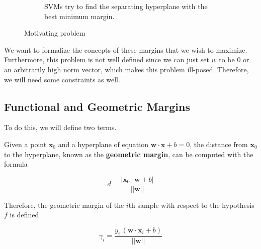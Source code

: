 \begin{example}
\begin{figure}[H]
\begin{subfigure}[b]{0.45\textwidth}
        \caption{SVMs try to find the separating hyperplane with the best minimum margin.} 
        \label{fig:svm_intro2}
      \end{subfigure} 
      \caption{Motivating problem} 
      \label{fig:svm_intro} 
    \end{figure}
  \end{example} 

  We want to formalize the concepts of these margins that we wish to maximize. Furthermore, this problem is not well defined since we can just set $w$ to be $0$ or an arbitrarily high norm vector, which makes this problem ill-posed. Therefore, we will need some constraints as well. 

\subsection{Functional and Geometric Margins} 
  
  To do this, we will define two terms. 

  \begin{definition}
    Given a point $\mathbf{x}_0$ and a hyperplane of equation $\mathbf{w} \cdot \mathbf{x} + b = 0$, the distance from $\mathbf{x}_0$ to the hyperplane, known as the \textbf{geometric margin}, can be computed with the formula 

    \begin{equation}
      d = \frac{|\mathbf{x}_0 \cdot \mathbf{w} + b|}{||\mathbf{w}||}  
    \end{equation} 

    Therefore, the geometric margin of the $i$th sample with respect to the hypothesis $f$ is defined 

    \begin{equation}
      \gamma_i = \frac{y_i \, (\mathbf{w} \cdot \mathbf{x}_i + b)}{||\mathbf{w}||} 
    \end{equation} 
  \end{definition}


